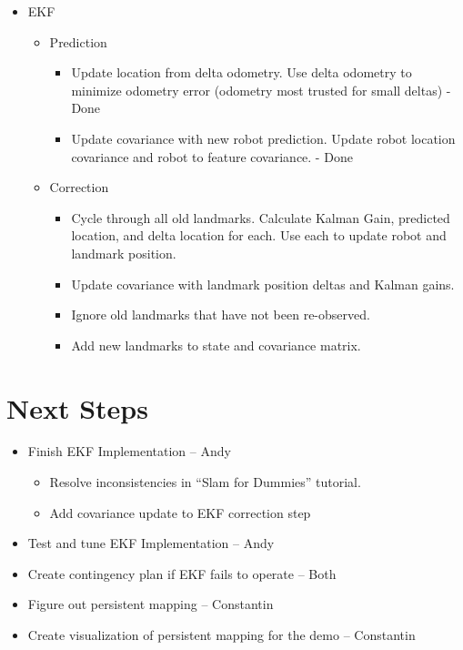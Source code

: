 \documentclass[12pt]{article}
\begin{document}
\begin{itemize}
    \item EKF
    \begin{itemize}
        \setlength{\itemsep}{0pt}
        \setlength{\parskip}{0pt}
        \setlength{\parsep}{0pt}
        \item Prediction
          \begin{itemize}
            \setlength{\itemsep}{0pt}
            \setlength{\parskip}{0pt}
            \setlength{\parsep}{0pt}
            \item Update location from delta odometry. Use
              delta odometry to minimize odometry error
              (odometry most trusted for small deltas) - Done
            \item Update covariance with new robot prediction. Update
              robot location covariance and robot to feature covariance. - Done
          \end{itemize}
        \item Correction
          \begin{itemize}
            \setlength{\itemsep}{0pt}
            \setlength{\parskip}{0pt}
            \setlength{\parsep}{0pt}
            \item Cycle through all old landmarks. Calculate Kalman Gain,
              predicted location, and delta location for each. Use each
              to update robot and landmark position.
            \item Update covariance with landmark position deltas and Kalman
              gains.
            \item Ignore old landmarks that have not been re-observed.
            \item Add new landmarks to state and covariance matrix.
          \end{itemize}
    \end{itemize}
\end{itemize}

\section{Next Steps}

\begin{itemize}
    \setlength{\itemsep}{0pt}
    \setlength{\parskip}{0pt}
    \setlength{\parsep}{0pt}
    \item Finish EKF Implementation -- Andy
      \begin{itemize}
            \setlength{\itemsep}{0pt}
            \setlength{\parskip}{0pt}
            \setlength{\parsep}{0pt}
            \item Resolve inconsistencies in ``Slam for Dummies'' tutorial.
            \item Add covariance update to EKF correction step
      \end{itemize}
    \item Test and tune EKF Implementation -- Andy
    \item Create contingency plan if EKF fails to operate -- Both
    \item Figure out persistent mapping -- Constantin
    \item Create visualization of persistent mapping for the demo -- Constantin
\end{itemize}
\end{document}
